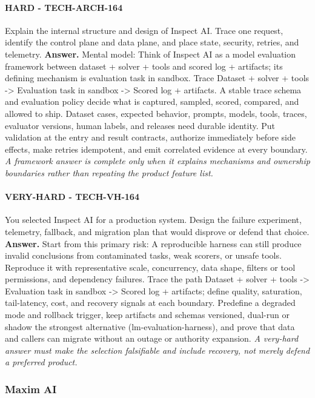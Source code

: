 \paragraph{HARD - TECH-ARCH-164} Explain the internal structure and design of Inspect AI. Trace one request, identify the control plane and data plane, and place state, security, retries, and telemetry.
\textbf{Answer.} Mental model: Think of Inspect AI as a model evaluation framework between dataset + solver + tools and scored log + artifacts; its defining mechanism is evaluation task in sandbox. Trace Dataset + solver + tools -> Evaluation task in sandbox -> Scored log + artifacts. A stable trace schema and evaluation policy decide what is captured, sampled, scored, compared, and allowed to ship. Dataset cases, expected behavior, prompts, models, tools, traces, evaluator versions, human labels, and releases need durable identity. Put validation at the entry and result contracts, authorize immediately before side effects, make retries idempotent, and emit correlated evidence at every boundary.
\textit{A framework answer is complete only when it explains mechanisms and ownership boundaries rather than repeating the product feature list.}
\paragraph{VERY-HARD - TECH-VH-164} You selected Inspect AI for a production system. Design the failure experiment, telemetry, fallback, and migration plan that would disprove or defend that choice.
\textbf{Answer.} Start from this primary risk: A reproducible harness can still produce invalid conclusions from contaminated tasks, weak scorers, or unsafe tools. Reproduce it with representative scale, concurrency, data shape, filters or tool permissions, and dependency failures. Trace the path Dataset + solver + tools -> Evaluation task in sandbox -> Scored log + artifacts; define quality, saturation, tail-latency, cost, and recovery signals at each boundary. Predefine a degraded mode and rollback trigger, keep artifacts and schemas versioned, dual-run or shadow the strongest alternative (lm-evaluation-harness), and prove that data and callers can migrate without an outage or authority expansion.
\textit{A very-hard answer must make the selection falsifiable and include recovery, not merely defend a preferred product.}
\subsubsection*{Maxim AI}
